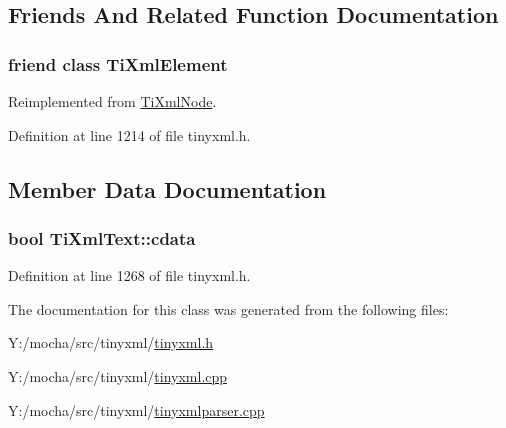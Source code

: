 \subsection{Friends And Related Function Documentation}
\hypertarget{class_ti_xml_text_ab6592e32cb9132be517cc12a70564c4b}{
\subsubsection[{TiXmlElement}]{\setlength{\rightskip}{0pt plus 5cm}friend class {\bf TiXmlElement}}}
\label{class_ti_xml_text_ab6592e32cb9132be517cc12a70564c4b}


Reimplemented from \hyperlink{class_ti_xml_node_ab6592e32cb9132be517cc12a70564c4b}{TiXmlNode}.



Definition at line 1214 of file tinyxml.h.



\subsection{Member Data Documentation}
\hypertarget{class_ti_xml_text_a1919a0467daf2cf5d099b225add5b9f1}{
\subsubsection[{cdata}]{\setlength{\rightskip}{0pt plus 5cm}bool {\bf TiXmlText::cdata}}}
\label{class_ti_xml_text_a1919a0467daf2cf5d099b225add5b9f1}


Definition at line 1268 of file tinyxml.h.



The documentation for this class was generated from the following files:\begin{DoxyCompactItemize}
\item 
Y:/mocha/src/tinyxml/\hyperlink{tinyxml_8h}{tinyxml.h}\item 
Y:/mocha/src/tinyxml/\hyperlink{tinyxml_8cpp}{tinyxml.cpp}\item 
Y:/mocha/src/tinyxml/\hyperlink{tinyxmlparser_8cpp}{tinyxmlparser.cpp}\end{DoxyCompactItemize}
